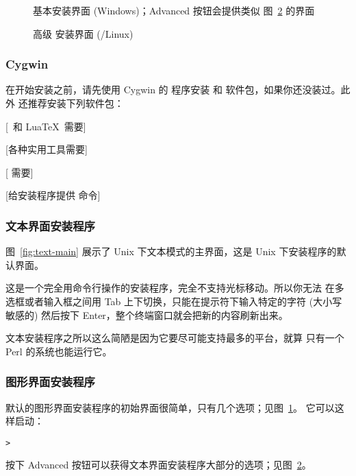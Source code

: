 \documentclass{article}
\begin{document}
\begin{figure}[tb]
  \caption{基本安装界面 (Windows)；Advanced 按钮会提供类似
    图~\ref{fig:advanced-lnx} 的界面}\label{fig:basic-w32}
\end{figure}

\begin{figure}[tb]
  \caption{高级 \GUI{} 安装界面
    (\GNU/Linux)}\label{fig:advanced-lnx}
\end{figure}


\subsubsection{Cygwin}
\label{sec:cygwin}

在开始安装之前，请先使用 Cygwin 的  程序安装
 和  软件包，如果你还没装过。此外
还推荐安装下列软件包：
\begin{itemize*}
  \item {} [\XeTeX\ 和 Lua\TeX\ 需要]
  \item {} [各种实用工具需要]
  \item {} [ 需要]
  \item {} [给安装程序提供  命令]
\end{itemize*}

\subsubsection{文本界面安装程序}

图~\ref{fig:text-main} 展示了 Unix 下文本模式的主界面，这是 Unix
下安装程序的默认界面。

这是一个完全用命令行操作的安装程序，完全不支持光标移动。所以你无法
在多选框或者输入框之间用 Tab 上下切换，只能在提示符下输入特定的字符
(大小写敏感的) 然后按下 Enter，整个终端窗口就会把新的内容刷新出来。

文本安装程序之所以这么简陋是因为它要尽可能支持最多的平台，就算
只有一个 Perl 的系统也能运行它。

\subsubsection{图形界面安装程序}
\label{sec:graphical-inst}

默认的图形界面安装程序的初始界面很简单，只有几个选项；见图~\ref{fig:basic-w32}。
它可以这样启动：
\begin{alltt}
  > 
\end{alltt}
按下 Advanced 按钮可以获得文本界面安装程序大部分的选项；见图~\ref{fig:advanced-lnx}。
\end{document}
